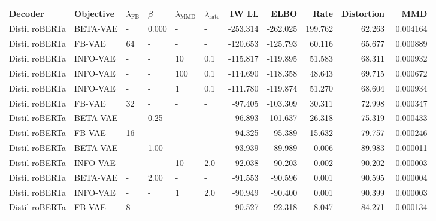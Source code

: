 \begin{table}[!htb]
    \centering
    \scriptsize
    \begin{tabular}{llllll|rrrrr}
    \toprule
        Decoder & Objective & $\lambda_{\text{FB}}$ &  $\beta$ & $\lambda_{\text{MMD}}$ & $\lambda_{\text{rate}}$ &    IW LL &     ELBO &    Rate &  Distortion &        MMD \\
\midrule
 Distil roBERTa &  BETA-VAE &         - & 0.000 &     - &      - & -253.314 & -262.025 & 199.762 &      62.263 &   0.004164 \\
 Distil roBERTa &    FB-VAE &        64 &     - &     - &      - & -120.653 & -125.793 &  60.116 &      65.677 &   0.000889 \\
 Distil roBERTa &  INFO-VAE &         - &     - &    10 &  0.1 & -115.817 & -119.895 &  51.583 &      68.311 &   0.000932 \\
 Distil roBERTa &  INFO-VAE &         - &     - &   100 &  0.1 & -114.690 & -118.358 &  48.643 &      69.715 &   0.000672 \\
 Distil roBERTa &  INFO-VAE &         - &     - &     1 &  0.1 & -111.780 & -119.874 &  51.270 &      68.604 &   0.000934 \\
 Distil roBERTa &    FB-VAE &        32 &     - &     - &      - &  -97.405 & -103.309 &  30.311 &      72.998 &   0.000347 \\
 Distil roBERTa &  BETA-VAE &         - & 0.25 &     - &      - &  -96.893 & -101.637 &  26.318 &      75.319 &   0.000433 \\
 Distil roBERTa &    FB-VAE &        16 &     - &     - &      - &  -94.325 &  -95.389 &  15.632 &      79.757 &   0.000246 \\
 Distil roBERTa &  BETA-VAE &         - & 1.00 &     - &      - &  -93.939 &  -89.989 &   0.006 &      89.983 &   0.000011 \\
 Distil roBERTa &  INFO-VAE &         - &     - &    10 &  2.0 &  -92.038 &  -90.203 &   0.002 &      90.202 &  -0.000003 \\
 Distil roBERTa &  BETA-VAE &         - & 2.00 &     - &      - &  -91.553 &  -90.596 &   0.001 &      90.595 &   0.000004 \\
 Distil roBERTa &  INFO-VAE &         - &     - &     1 &  2.0 &  -90.949 &  -90.400 &   0.001 &      90.399 &   0.000003 \\
 Distil roBERTa &    FB-VAE &         8 &     - &     - &      - &  -90.527 &  -92.318 &   8.047 &      84.271 &   0.000134 \\

\end{tabular}
\end{table}
